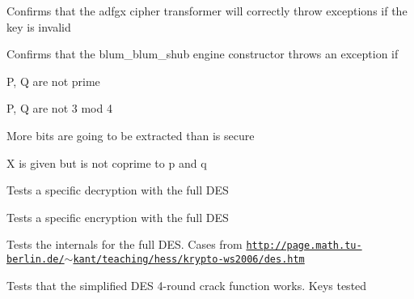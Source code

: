 
\begin{DoxyRefList}
\item[\label{test__test000001}%
\hypertarget{test__test000001}{}%
Member \hyperlink{test__adfgx_8cpp_ab1feb16ceb12dd1169ce2c4c7b18a2e4}{T\+E\+S\+T\+\_\+\+C\+A\+SE} (\char`\"{}\+A\+D\+F\+G\+X cipher errors\char`\"{})]Confirms that the adfgx cipher transformer will correctly throw exceptions if the key is invalid  
\item[\label{test__test000033}%
\hypertarget{test__test000033}{}%
Member \hyperlink{test__bbs_8cpp_aed1a29ce8a080760a2f04dee32910007}{T\+E\+S\+T\+\_\+\+C\+A\+SE} (\char`\"{}bbs constructor errors\char`\"{})]Confirms that the blum\+\_\+blum\+\_\+shub engine constructor throws an exception if
\begin{DoxyItemize}
\item P, Q are not prime
\item P, Q are not 3 mod 4
\item More bits are going to be extracted than is secure
\item X is given but is not coprime to p and q  
\end{DoxyItemize}
\item[\label{test__test000032}%
\hypertarget{test__test000032}{}%
Member \hyperlink{test__des64_8cpp_a9d5b8fc0d23bf7cbfc3b35ca42461bdf}{T\+E\+S\+T\+\_\+\+C\+A\+SE} (\char`\"{}\+D\+E\+S64 Decrypt\char`\"{})]Tests a specific decryption with the full D\+ES  
\item[\label{test__test000031}%
\hypertarget{test__test000031}{}%
Member \hyperlink{test__des64_8cpp_aa0b2cdc601dfc14088db0415f201f7d0}{T\+E\+S\+T\+\_\+\+C\+A\+SE} (\char`\"{}\+D\+E\+S64 Encrypt\char`\"{})]Tests a specific encryption with the full D\+ES  
\item[\label{test__test000030}%
\hypertarget{test__test000030}{}%
Member \hyperlink{test__des64_8cpp_ab5087aae0e04503ebe5798d9b25366d0}{T\+E\+S\+T\+\_\+\+C\+A\+SE} (\char`\"{}\+D\+E\+S64 Internals\char`\"{})]Tests the internals for the full D\+ES. Cases from \href{http://page.math.tu-berlin.de/~kant/teaching/hess/krypto-ws2006/des.htm}{\tt http\+://page.\+math.\+tu-\/berlin.\+de/$\sim$kant/teaching/hess/krypto-\/ws2006/des.\+htm} 
\item[\label{test__test000029}%
\hypertarget{test__test000029}{}%
Member \hyperlink{test__des4_8cpp_ae08f4657457a894aea1654a3253dbf1c}{T\+E\+S\+T\+\_\+\+C\+A\+SE} (\char`\"{}4 Round Crack\char`\"{})]Tests that the simplified D\+ES 4-\/round crack function works. Keys tested
\begin{DoxyItemize}

\end{DoxyItemize}
\end{DoxyRefList}

